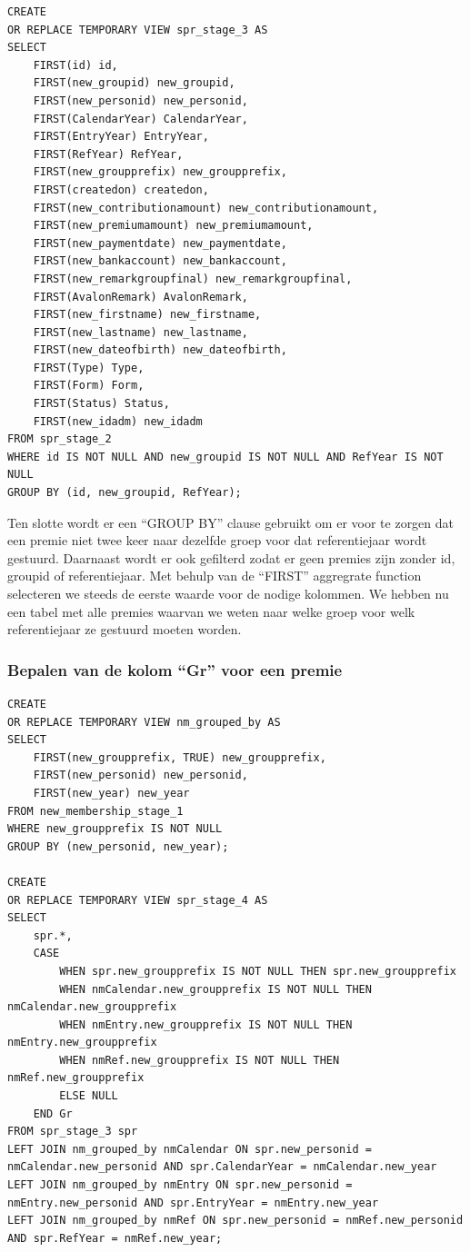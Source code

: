 \begin{verbatim}
CREATE 
OR REPLACE TEMPORARY VIEW spr_stage_3 AS 
SELECT 
    FIRST(id) id, 
    FIRST(new_groupid) new_groupid, 
    FIRST(new_personid) new_personid,
    FIRST(CalendarYear) CalendarYear,
    FIRST(EntryYear) EntryYear,
    FIRST(RefYear) RefYear,
    FIRST(new_groupprefix) new_groupprefix,
    FIRST(createdon) createdon,
    FIRST(new_contributionamount) new_contributionamount,
    FIRST(new_premiumamount) new_premiumamount,
    FIRST(new_paymentdate) new_paymentdate,
    FIRST(new_bankaccount) new_bankaccount,
    FIRST(new_remarkgroupfinal) new_remarkgroupfinal,
    FIRST(AvalonRemark) AvalonRemark,
    FIRST(new_firstname) new_firstname,
    FIRST(new_lastname) new_lastname,
    FIRST(new_dateofbirth) new_dateofbirth,
    FIRST(Type) Type,
    FIRST(Form) Form,
    FIRST(Status) Status,
    FIRST(new_idadm) new_idadm
FROM spr_stage_2 
WHERE id IS NOT NULL AND new_groupid IS NOT NULL AND RefYear IS NOT NULL
GROUP BY (id, new_groupid, RefYear);
\end{verbatim}

Ten slotte wordt er een ``GROUP BY'' clause gebruikt om er voor te zorgen dat een premie niet twee keer naar dezelfde groep voor dat referentiejaar wordt gestuurd. Daarnaast wordt er ook gefilterd zodat er geen premies zijn zonder id, groupid of referentiejaar. Met behulp van de ``FIRST'' aggregrate function selecteren we steeds de eerste waarde voor de nodige kolommen. We hebben nu een tabel met alle premies waarvan we weten naar welke groep voor welk referentiejaar ze gestuurd moeten worden.

\subsubsection{Bepalen van de kolom ``Gr'' voor een premie}

\begin{verbatim}
CREATE
OR REPLACE TEMPORARY VIEW nm_grouped_by AS
SELECT 
    FIRST(new_groupprefix, TRUE) new_groupprefix, 
    FIRST(new_personid) new_personid, 
    FIRST(new_year) new_year 
FROM new_membership_stage_1
WHERE new_groupprefix IS NOT NULL 
GROUP BY (new_personid, new_year);

CREATE 
OR REPLACE TEMPORARY VIEW spr_stage_4 AS 
SELECT
    spr.*,
    CASE
        WHEN spr.new_groupprefix IS NOT NULL THEN spr.new_groupprefix
        WHEN nmCalendar.new_groupprefix IS NOT NULL THEN nmCalendar.new_groupprefix
        WHEN nmEntry.new_groupprefix IS NOT NULL THEN nmEntry.new_groupprefix
        WHEN nmRef.new_groupprefix IS NOT NULL THEN nmRef.new_groupprefix
        ELSE NULL
    END Gr
FROM spr_stage_3 spr
LEFT JOIN nm_grouped_by nmCalendar ON spr.new_personid = nmCalendar.new_personid AND spr.CalendarYear = nmCalendar.new_year
LEFT JOIN nm_grouped_by nmEntry ON spr.new_personid = nmEntry.new_personid AND spr.EntryYear = nmEntry.new_year
LEFT JOIN nm_grouped_by nmRef ON spr.new_personid = nmRef.new_personid AND spr.RefYear = nmRef.new_year;
\end{verbatim}

